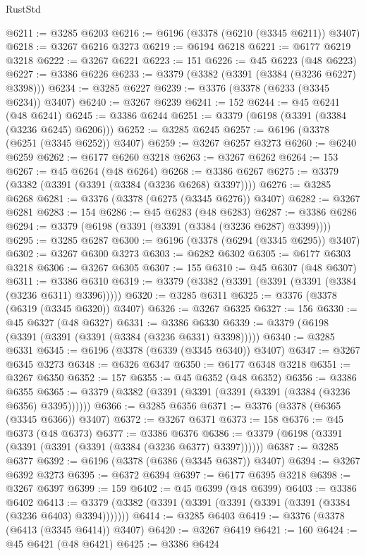 \begin{lexlean}{RustStd}
\begin{coremodule}
@6211 := @3285 @6203
@6216 := @6196 (@3378 (@6210 (@3345 @6211)) @3407)
@6218 := @3267 @6216 @3273
@6219 := @6194 @6218
@6221 := @6177 @6219 @3218
@6222 := @3267 @6221
@6223 := 151
@6226 := @45 @6223 (@48 @6223)
@6227 := @3386 @6226
@6233 := @3379 (@3382 (@3391 (@3384 (@3236 @6227) @3398)))
@6234 := @3285 @6227
@6239 := @3376 (@3378 (@6233 (@3345 @6234)) @3407)
@6240 := @3267 @6239
@6241 := 152
@6244 := @45 @6241 (@48 @6241)
@6245 := @3386 @6244
@6251 := @3379 (@6198 (@3391 (@3384 (@3236 @6245) @6206)))
@6252 := @3285 @6245
@6257 := @6196 (@3378 (@6251 (@3345 @6252)) @3407)
@6259 := @3267 @6257 @3273
@6260 := @6240 @6259
@6262 := @6177 @6260 @3218
@6263 := @3267 @6262
@6264 := 153
@6267 := @45 @6264 (@48 @6264)
@6268 := @3386 @6267
@6275 := @3379 (@3382 (@3391 (@3391 (@3384 (@3236 @6268) @3397))))
@6276 := @3285 @6268
@6281 := @3376 (@3378 (@6275 (@3345 @6276)) @3407)
@6282 := @3267 @6281
@6283 := 154
@6286 := @45 @6283 (@48 @6283)
@6287 := @3386 @6286
@6294 := @3379 (@6198 (@3391 (@3391 (@3384 (@3236 @6287) @3399))))
@6295 := @3285 @6287
@6300 := @6196 (@3378 (@6294 (@3345 @6295)) @3407)
@6302 := @3267 @6300 @3273
@6303 := @6282 @6302
@6305 := @6177 @6303 @3218
@6306 := @3267 @6305
@6307 := 155
@6310 := @45 @6307 (@48 @6307)
@6311 := @3386 @6310
@6319 := @3379 (@3382 (@3391 (@3391 (@3391 (@3384 (@3236 @6311) @3396)))))
@6320 := @3285 @6311
@6325 := @3376 (@3378 (@6319 (@3345 @6320)) @3407)
@6326 := @3267 @6325
@6327 := 156
@6330 := @45 @6327 (@48 @6327)
@6331 := @3386 @6330
@6339 := @3379 (@6198 (@3391 (@3391 (@3391 (@3384 (@3236 @6331) @3398)))))
@6340 := @3285 @6331
@6345 := @6196 (@3378 (@6339 (@3345 @6340)) @3407)
@6347 := @3267 @6345 @3273
@6348 := @6326 @6347
@6350 := @6177 @6348 @3218
@6351 := @3267 @6350
@6352 := 157
@6355 := @45 @6352 (@48 @6352)
@6356 := @3386 @6355
@6365 := @3379 (@3382 (@3391 (@3391 (@3391 (@3391 (@3384 (@3236 @6356) @3395))))))
@6366 := @3285 @6356
@6371 := @3376 (@3378 (@6365 (@3345 @6366)) @3407)
@6372 := @3267 @6371
@6373 := 158
@6376 := @45 @6373 (@48 @6373)
@6377 := @3386 @6376
@6386 := @3379 (@6198 (@3391 (@3391 (@3391 (@3391 (@3384 (@3236 @6377) @3397))))))
@6387 := @3285 @6377
@6392 := @6196 (@3378 (@6386 (@3345 @6387)) @3407)
@6394 := @3267 @6392 @3273
@6395 := @6372 @6394
@6397 := @6177 @6395 @3218
@6398 := @3267 @6397
@6399 := 159
@6402 := @45 @6399 (@48 @6399)
@6403 := @3386 @6402
@6413 := @3379 (@3382 (@3391 (@3391 (@3391 (@3391 (@3391 (@3384 (@3236 @6403) @3394)))))))
@6414 := @3285 @6403
@6419 := @3376 (@3378 (@6413 (@3345 @6414)) @3407)
@6420 := @3267 @6419
@6421 := 160
@6424 := @45 @6421 (@48 @6421)
@6425 := @3386 @6424

\end{coremodule}
\end{lexlean}
